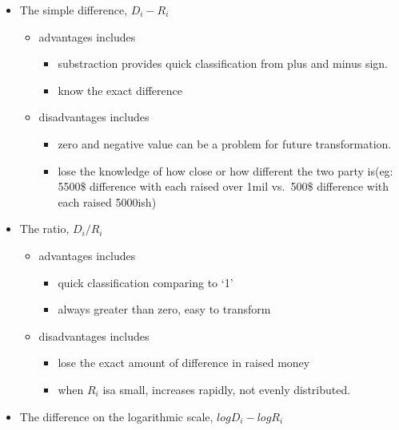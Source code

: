 \documentclass[]{article}
\providecommand{\tightlist}{%
  \setlength{\itemsep}{0pt}\setlength{\parskip}{0pt}}
\begin{document}
\begin{itemize}
\tightlist
\item
  The simple difference, \(D_i-R_i\)

  \begin{itemize}
  \tightlist
  \item
    advantages includes

    \begin{itemize}
    \tightlist
    \item
      substraction provides quick classification from plus and minus
      sign.
    \item
      know the exact difference
    \end{itemize}
  \item
    disadvantages includes

    \begin{itemize}
    \tightlist
    \item
      zero and negative value can be a problem for future
      transformation.
    \item
      lose the knowledge of how close or how different the two party
      is(eg: 5500\$ difference with each raised over 1mil vs.~500\$
      difference with each raised 5000ish)
    \end{itemize}
  \end{itemize}
\item
  The ratio, \(D_i/R_i\)

  \begin{itemize}
  \tightlist
  \item
    advantages includes

    \begin{itemize}
    \tightlist
    \item
      quick classification comparing to `1'
    \item
      always greater than zero, easy to transform
    \end{itemize}
  \item
    disadvantages includes

    \begin{itemize}
    \tightlist
    \item
      lose the exact amount of difference in raised money
    \item
      when \(R_i\) isa small, increases rapidly, not evenly distributed.
    \end{itemize}
  \end{itemize}
\item
  The difference on the logarithmic scale, \(log D_i-log R_i\)


\end{itemize}
\end{document}
